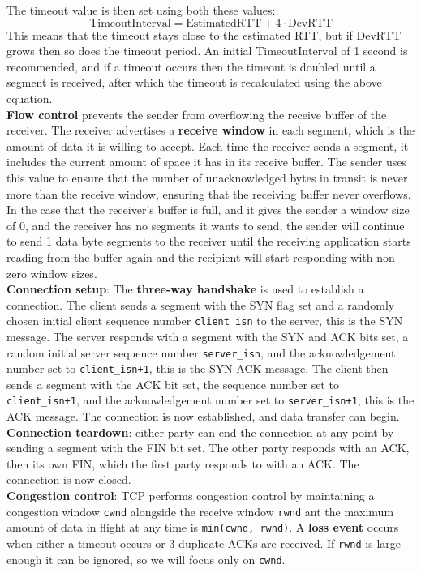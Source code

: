 The timeout value is then set using both these values:
\[
	\text{TimeoutInterval}=\text{EstimatedRTT}+4\cdot\text{DevRTT}
\]
This means that the timeout stays close to the estimated RTT, but if $\text{DevRTT}$ grows then so does the timeout period.
An initial $\text{TimeoutInterval}$ of 1 second is recommended, and if a timeout occurs then the timeout is doubled until a segment is received, after which the timeout is recalculated using the above equation.\\
\textbf{Flow control} prevents the sender from overflowing the receive buffer of the receiver. The receiver advertises a \textbf{receive window} in each segment, which is the amount of data it is willing to accept. Each time the receiver sends a segment, it includes the current amount of space it has in its receive buffer. The sender uses this value to ensure that the number of unacknowledged bytes in transit is never more than the receive window, ensuring that the receiving buffer never overflows. In the case that the receiver's buffer is full, and it gives the sender a window size of 0, and the receiver has no segments it wants to send, the sender will continue to send 1 data byte segments to the receiver until the receiving application starts reading from the buffer again and the recipient will start responding with non-zero window sizes.\\
\textbf{Connection setup}: The \textbf{three-way handshake} is used to establish a connection. The client sends a segment with the SYN flag set and a randomly chosen initial client sequence number \verb|client_isn| to the server, this is the SYN message. The server responds with a segment with the SYN and ACK bits set, a random initial server sequence number \verb|server_isn|, and the acknowledgement number set to \verb|client_isn+1|, this is the SYN-ACK message. The client then sends a segment with the ACK bit set, the sequence number set to \verb|client_isn+1|, and the acknowledgement number set to \verb|server_isn+1|, this is the ACK message. The connection is now established, and data transfer can begin.\\
\textbf{Connection teardown}: either party can end the connection at any point by sending a segment with the FIN bit set. The other party responds with an ACK, then its own FIN, which the first party responds to with an ACK. The connection is now closed.\\
\textbf{Congestion control}: TCP performs congestion control by maintaining a congestion window \verb|cwnd| alongside the receive window \verb|rwnd| ant the maximum amount of data in flight at any time is \verb|min(cwnd, rwnd)|. A \textbf{loss event} occurs when either a timeout occurs or 3 duplicate ACKs are received. If \verb|rwnd| is large enough it can be ignored, so we will focus only on \verb|cwnd|.\\
